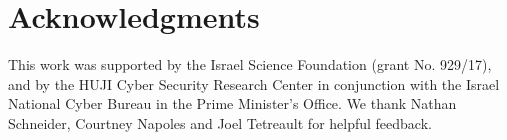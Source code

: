 \documentclass[11pt, a4paper]{article}
\newcommand{\lc}[1]{\footnote{\color{blue}LC: #1}}
\begin{document}
%
%
%

\section*{Acknowledgments}

This work was supported by the Israel Science Foundation (grant No. 929/17),
and by the HUJI Cyber Security Research Center in conjunction with the Israel
National Cyber Bureau in the Prime Minister's Office.
We thank Nathan Schneider, Courtney Napoles and Joel Tetreault for helpful feedback.



\end{document}
